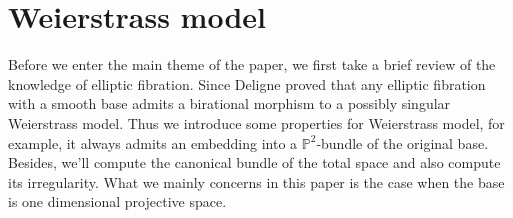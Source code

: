 
\chapter{Weierstrass model}
Before we enter the main theme of the paper, we first take a brief review of the knowledge of elliptic fibration. Since Deligne proved\cite{deligne1975courbes} that any elliptic fibration with a smooth base admits a birational morphism to a possibly singular Weierstrass model. Thus we introduce some properties for Weierstrass model, for example, it always admits an embedding into a $\mathbb{P}^2$-bundle of the original base. Besides, we'll compute the canonical bundle of the total space and also compute its irregularity. What we mainly concerns in this paper is the case when the base is one dimensional projective space.
